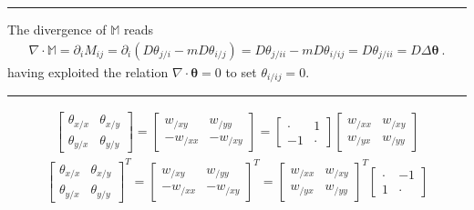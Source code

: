 \documentclass[letterpaper,10pt,english]{jupyterBook}
\begin{document}
\bigskip\hrule\bigskip


\sphinxAtStartPar
The divergence of \(\mathbb{M}\) reads
\begin{equation*}
\begin{split}\nabla \cdot \mathbb{M} = \partial_{i} M_{ij} = \partial_{i} \left( D \theta_{j/i} - m D \theta_{i/j} \right) = D \theta_{j/ii} - m D \theta_{i/ij} =  D \theta_{j/ii} = D \Delta \boldsymbol{\theta} \ . \end{split}
\end{equation*}
\sphinxAtStartPar
having exploited the relation \(\nabla \cdot \boldsymbol\theta = 0\) to set \(\theta_{i/ij} = 0\).


\bigskip\hrule\bigskip

\begin{equation*}
\begin{split}
\begin{bmatrix} \theta_{x/x} & \theta_{x/y} \\ \theta_{y/x} & \theta_{y/y} \end{bmatrix} = \begin{bmatrix} w_{/xy} & w_{/yy} \\ - w_{/xx} & - w_{/xy} \end{bmatrix} =   \begin{bmatrix} \cdot &  1 \\ - 1 & \cdot \end{bmatrix} \begin{bmatrix} w_{/xx} & w_{/xy} \\ w_{/yx} & w_{ /yy} \end{bmatrix}
\end{split}
\end{equation*}\begin{equation*}
\begin{split}
\begin{bmatrix} \theta_{x/x} & \theta_{x/y} \\ \theta_{y/x} & \theta_{y/y} \end{bmatrix}^T = \begin{bmatrix} w_{/xy} & w_{/yy} \\ - w_{/xx} & - w_{/xy} \end{bmatrix}^T =   \begin{bmatrix} w_{/xx} & w_{/xy} \\ w_{/yx} & w_{ /yy} \end{bmatrix}^T \begin{bmatrix} \cdot & -1 \\ 1 & \cdot \end{bmatrix}
\end{split}
\end{equation*}
\end{document}
